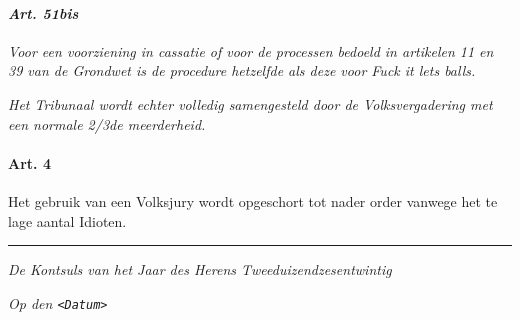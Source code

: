 \hypertarget{art.-51bis}{%
\paragraph{\texorpdfstring{\emph{Art.
51bis}}{Art. 51bis}}\label{art.-51bis}}

\emph{Voor een voorziening in cassatie of voor de processen bedoeld in
artikelen 11 en 39 van de Grondwet is de procedure hetzelfde als deze
voor Fuck it lets balls.}

\emph{Het Tribunaal wordt echter volledig samengesteld door de
Volksvergadering met een normale 2/3de meerderheid.}

\hypertarget{art.-4}{%
\paragraph{Art. 4}\label{art.-4}}

Het gebruik van een Volksjury wordt opgeschort tot nader order vanwege
het te lage aantal Idioten.

\begin{center}\rule{0.5\linewidth}{0.5pt}\end{center}

\emph{De Kontsuls van het Jaar des Herens Tweeduizendzesentwintig}

\emph{Op den \texttt{\textless{}Datum\textgreater{}}}
